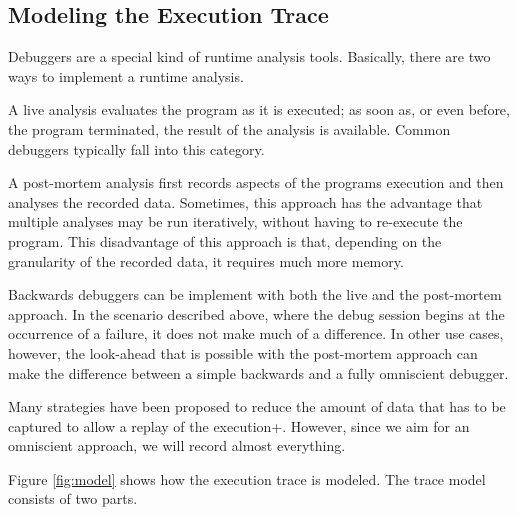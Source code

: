 \subsection{Modeling the Execution Trace}

Debuggers are a special kind of runtime analysis tools.
Basically, there are two ways to implement a runtime analysis.

A live analysis evaluates the program as it is executed; as soon as, or even before, the program terminated, the result of the analysis is available.
Common debuggers typically fall into this category.

A post-mortem analysis first records aspects of the programs execution and then analyses the recorded data.
Sometimes, this approach has the advantage that multiple analyses may be run iteratively, without having to re-execute the program.
This disadvantage of this approach is that, depending on the granularity of the recorded data, it requires much more memory.

Backwards debuggers can be implement with both the live and the post-mortem approach.
In the scenario described above, where the debug session begins at the occurrence of a failure, it does not make much of a difference.
In other use cases, however, the look-ahead that is possible with the post-mortem approach can make the difference between a simple backwards and a fully omniscient debugger.

Many strategies have been proposed to reduce the amount of data that has to be captured to allow a replay of the execution+\cite{pothier_07_scalable_omniscient_debugging, lienhard_08_practical_objectoriented_backintime_debugging}.
However, since we aim for an omniscient approach, we will record almost everything.

Figure \ref{fig:model} shows how the execution trace is modeled.
The trace model consists of two parts.


